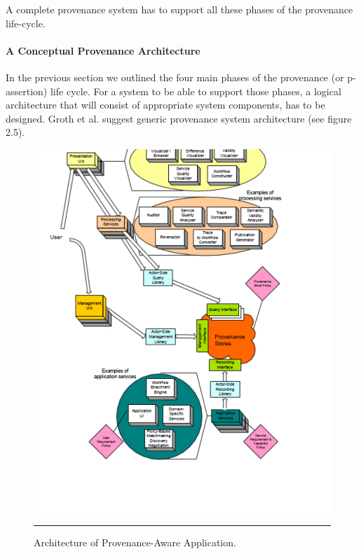 A complete provenance system has to support all these phases of the provenance life-cycle.

\paragraph{A Conceptual Provenance Architecture}

In the previous section we outlined the four main phases of the provenance (or p-assertion) life cycle. For a system to be able to support those phases, a logical architecture that will consist of appropriate system components, has to be designed. Groth et al.\cite{reference10} suggest generic provenance system architecture (see figure 2.5).

\begin{figure}[htbp]
	\centering
		\includegraphics[scale=0.80]{./Figures/chapter2/figure5.pdf}
		\rule{35em}{0.5pt}
	\caption[Architecture of Provenance-Aware Application]{Architecture of Provenance-Aware Application.\cite{reference10}}
	\label{fig:provArch}
\end{figure}

